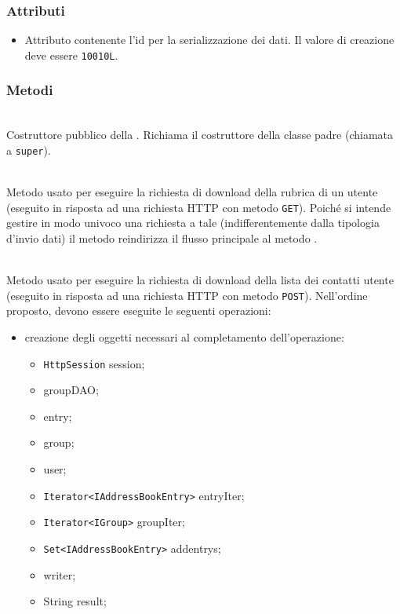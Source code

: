 \subsubsection*{Attributi}

\begin{itemize}
	\item{}
	Attributo contenente l'id per la serializzazione dei dati. Il valore di creazione deve essere \texttt{10010L}.
\end{itemize}

\subsubsection*{Metodi}

\begin{description}
	\item{}\\
	Costruttore pubblico della . Richiama il costruttore della classe padre (chiamata a \texttt{super}).
	
	\item{}\\
	Metodo usato per eseguire la richiesta di download della rubrica di un utente (eseguito in risposta ad una richiesta HTTP con metodo \texttt{GET}). Poiché si intende gestire in modo univoco una richiesta a tale  (indifferentemente dalla tipologia d'invio dati) il metodo reindirizza il flusso principale al metodo .
	
\item{}\\	
	Metodo usato per eseguire la richiesta di download della lista dei contatti utente (eseguito in risposta ad una richiesta HTTP con metodo \texttt{POST}). Nell'ordine proposto, devono essere eseguite le seguenti operazioni:
	\begin{itemize}
		\item creazione degli oggetti necessari al completamento dell'operazione:
		\begin{itemize}
			\item \texttt{HttpSession} session;
			\item {} groupDAO;
			\item {} entry;
			\item {} group;
			\item {} user;
			\item \texttt{Iterator<IAddressBookEntry>} entryIter;
			\item \texttt{Iterator<IGroup>} groupIter;
			\item \texttt{Set<IAddressBookEntry>} addentrys;
			\item {} writer;
			\item String result;
		\end{itemize}
		

\end{itemize}
\end{description}
